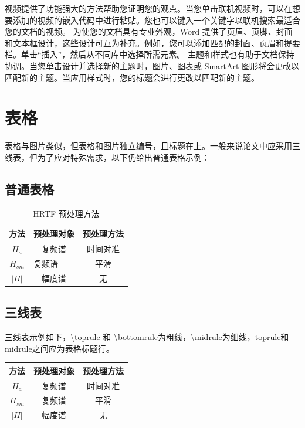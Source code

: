 视频提供了功能强大的方法帮助您证明您的观点。当您单击联机视频时，可以在想要添加的视频的嵌入代码中进行粘贴。您也可以键入一个关键字以联机搜索最适合您的文档的视频。
为使您的文档具有专业外观，Word 提供了页眉、页脚、封面和文本框设计，这些设计可互为补充。例如，您可以添加匹配的封面、页眉和提要栏。单击“插入”，然后从不同库中选择所需元素。
主题和样式也有助于文档保持协调。当您单击设计并选择新的主题时，图片、图表或 SmartArt 图形将会更改以匹配新的主题。当应用样式时，您的标题会进行更改以匹配新的主题。

\section{表格}
表格与图片类似，但表格和图片独立编号，且标题在上。一般来说论文中应采用三线表，但为了应对特殊需求，以下仍给出普通表格示例：
\subsection{普通表格}
\begin{table}[H]
	\caption{HRTF 预处理方法}
	\centering
	\begin{tabular}{|c|c|c|}
		\hline
		方法 & 预处理对象 & 预处理方法 \\
		\hline
		$H_{a}$ & 复频谱 & 时间对准 \\
		$H_{s m}$ & \multicolumn{1}{l|}{复频谱} & 平滑 \\
		$|H|$ & 幅度谱 & 无 \\
		
		\hline
	\end{tabular}
\end{table}

\subsection{三线表}
三线表示例如下，\textbackslash toprule 和 \textbackslash bottomrule为粗线，\textbackslash midrule为细线，toprule和midrule之间应为表格标题行。
\begin{table}[H]
	\centering
	\begin{tabular*}{\hsize}{@{\extracolsep{\fill}}ccc}
		\toprule
		方法 & 预处理对象 & 预处理方法 \\
		\midrule
		$H_{a}$ & 复频谱 & 时间对准 \\
		$H_{s m}$ & 复频谱 & 平滑 \\
		$|H|$ & 幅度谱 & 无 \\
		\bottomrule
	\end{tabular*}
	\label{tbl:pre_processing}
\end{table}



